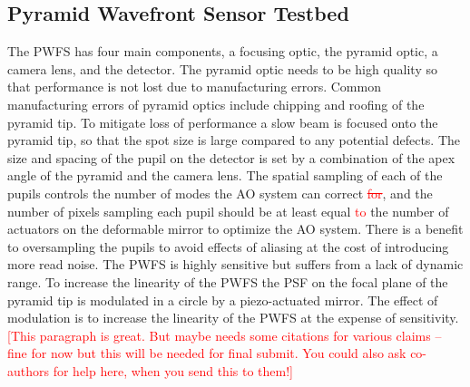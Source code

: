 \documentclass[12pt]{spieman}  %
\newcommand{\jrmadd}[1]{\textcolor{red}{#1}}
\newcommand{\jrmrmv}[1]{\textcolor{red}{\sout{#1}}}
\newcommand{\jrmcom}[1]{\textcolor{red}{[#1]}}
\begin{document}
\begin{spacing}{2}
\subsection{Pyramid Wavefront Sensor Testbed}

The PWFS has four main components, a focusing optic, the pyramid optic, a camera lens, and the detector. The pyramid optic needs to be high quality so that performance is not lost due to manufacturing errors. Common manufacturing errors of pyramid optics include chipping and roofing of the pyramid tip. To mitigate loss of performance a slow beam is focused onto the pyramid tip, so that the spot size is large compared to any potential defects. The size and spacing of the pupil on the detector is set by a combination of the apex angle of the pyramid and the camera lens. The spatial sampling of each of the pupils controls the number of modes the AO system can correct \jrmrmv{for}, and the number of pixels sampling each pupil should be at least equal \jrmadd{to} the number of actuators on the deformable mirror to optimize the AO system. There is a benefit to oversampling the pupils to avoid effects of aliasing at the cost of introducing more read noise. The PWFS is highly sensitive but suffers from a lack of dynamic range. To increase the linearity of the PWFS the PSF on the focal plane of the pyramid tip is modulated in a circle by a piezo-actuated mirror. The effect of modulation is to increase the linearity of the PWFS at the expense of sensitivity. \jrmcom{This paragraph is great.  But maybe needs some citations for various claims -- fine for now but this will be needed for final submit.  You could also ask co-authors for help here, when you send this to them!}


\end{spacing}
\end{document}
